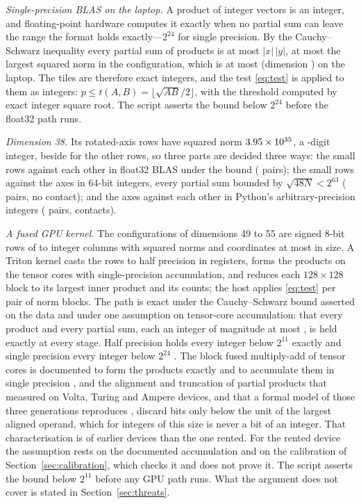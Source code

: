 \documentclass[preprint,11pt,authoryear,a4paper]{elsarticle}
\begin{document}
\emph{Single-precision BLAS on the laptop.} A product of integer vectors is an integer, and floating-point hardware computes it exactly when no partial sum can leave the range the format holds exactly---$2^{24}$ for single precision. By the Cauchy--Schwarz inequality every partial sum of products is at most $|x|\,|y|$, at most the largest squared norm in the configuration, which is \MtKwDeskMaxNorm{} at most (dimension \MtKwDeskMaxNormDim) on the laptop. The tiles are therefore exact integers, and the test \eqref{eq:test} is applied to them as integers: $p\le t(A,B)=\lfloor\sqrt{AB}/2\rfloor$, with the threshold computed by exact integer square root. The script asserts the bound below $2^{24}$ before the float32 path runs.

\emph{Dimension 38.} Its \MtKwAxisRows{} rotated-axis rows have squared norm $3.95\times 10^{35}$, a \MtKwAxisDigits-digit integer, beside \MtKwAxisOther{} for the other rows, so three parts are decided three ways: the small rows against each other in float32 BLAS under the bound \MtKwAxisOther{} (\QkDThirtyEightSmallPairs{} pairs); the small rows against the axes in 64-bit integers, every partial sum bounded by $\sqrt{48N}<2^{63}$ (\QkDThirtyEightMixedPairs{} pairs, no contact); and the axes against each other in Python's arbitrary-precision integers (\QkDThirtyEightAxisPairs{} pairs, \QkDThirtyEightAxisContacts{} contacts).

\emph{A fused GPU kernel.} The configurations of dimensions 49 to 55 are signed 8-bit rows of \QkGpuColumnsMin{} to \QkGpuColumnsMax{} integer columns with squared norms \QkGpuNorms{} and coordinates at most \QkGpuMaxCoord{} in size. A Triton kernel casts the rows to half precision in registers, forms the products on the tensor cores with single-precision accumulation, and reduces each $128\times128$ block to its largest inner product and its counts; the host applies \eqref{eq:test} per pair of norm blocks. The path is exact under the Cauchy--Schwarz bound asserted on the data and under one assumption on tensor-core accumulation: that every product and every partial sum, each an integer of magnitude at most \MtKwGpuMaxNorm, is held exactly at every stage. Half precision holds every integer below $2^{11}$ exactly and single precision every integer below $2^{24}$ \citep{IEEE754}. The block fused multiply-add of tensor cores is documented to form the products exactly and to accumulate them in single precision \citep{Blanchard20,HighamMary22}, and the alignment and truncation of partial products that \citet{Fasi21} measured on Volta, Turing and Ampere devices, and that a formal model of those three generations reproduces \citep{Valpey25}, discard bits only below the unit of the largest aligned operand, which for integers of this size is never a bit of an integer. That characterisation is of earlier devices than the one rented. For the rented device the assumption rests on the documented accumulation and on the calibration of Section~\ref{sec:calibration}, which checks it and does not prove it. The script asserts the bound below $2^{11}$ before any GPU path runs. What the argument does not cover is stated in Section~\ref{sec:threats}.
\end{document}

